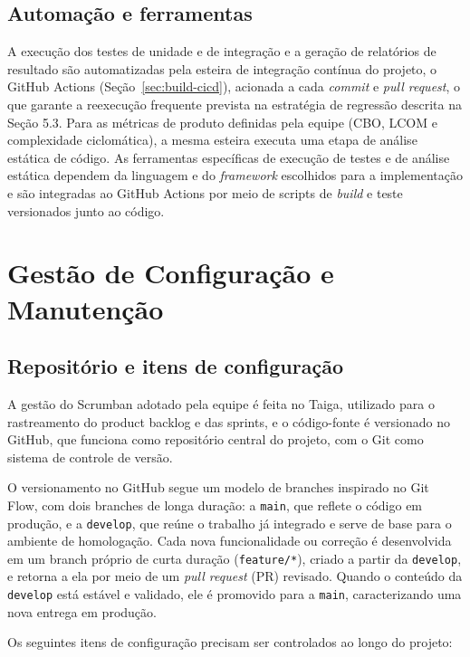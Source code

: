 \section{Automação e ferramentas}

A execução dos testes de unidade e de integração e a
geração de relatórios de resultado são automatizadas pela esteira de
integração contínua do projeto, o GitHub Actions
(Seção~\ref{sec:build-cicd}), acionada a cada \textit{commit} e
\textit{pull request}, o que garante a reexecução frequente prevista na
estratégia de regressão descrita na Seção 5.3. Para as métricas de produto
definidas pela equipe (CBO, LCOM e complexidade ciclomática), a mesma
esteira executa uma etapa de análise estática de código. As ferramentas específicas
de execução de testes e de análise estática dependem da linguagem e do
\textit{framework} escolhidos para a implementação e são integradas ao GitHub
Actions por meio de scripts de \textit{build} e teste versionados junto ao
código.

\chapter{Gestão de Configuração e Manutenção}

\section{Repositório e itens de configuração}\label{sec:config-repo}

A gestão do Scrumban adotado pela equipe é feita no Taiga, utilizado para
o rastreamento do product backlog e das sprints, e o código-fonte é
versionado no GitHub, que funciona como repositório central do projeto, com o
Git como sistema de controle de versão.

O versionamento no GitHub segue um modelo de branches inspirado no Git Flow,
com dois branches de longa duração: a \texttt{main}, que reflete o código em
produção, e a \texttt{develop}, que reúne o trabalho já integrado e serve de
base para o ambiente de homologação. Cada nova funcionalidade ou correção é
desenvolvida em um branch próprio de curta duração (\texttt{feature/*}),
criado a partir da \texttt{develop}, e retorna a ela por meio de um
\textit{pull request} (PR) revisado. Quando o conteúdo da \texttt{develop}
está estável e validado, ele é promovido para a \texttt{main}, caracterizando
uma nova entrega em produção.

Os seguintes itens de configuração precisam ser controlados ao longo do
projeto:

